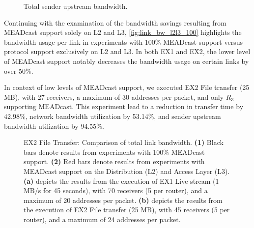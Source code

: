 \begin{figure}
    \begin{center}
        
    \end{center}
    \caption[Total sender upstream bandwidth]{Total sender upstream bandwidth.}
    \label{fig:upstreamcmp}
\end{figure}

Continuing with the examination of the bandwidth savings resulting from
    MEADcast support solely on L2 and L3, \autoref{fig:link_bw_l2l3_100}
    highlights the bandwidth usage per link in experiments with 100\% MEADcast
    support versus protocol support exclusively on L2 and L3.
In both EX1 and EX2, the lower level of MEADcast support notably decreases
    the bandwidth usage on certain links by over 50\%.
    
In context of low levels of MEADcast support, we executed EX2 File transfer
    (25 MB), with 27 receivers, a maximum of 30 addresses per packet, and only
    $R_3$ supporting MEADcast.
This experiment lead to a reduction in transfer time by 42.98\%, network
    bandwidth utilization by 53.14\%, and sender upstream bandwidth utilization
    by 94.55\%.

\begin{figure}
    \begin{center}
        
    \end{center}
    \caption[EX2 File Transfer: Comparison of total link bandwidth]{
        EX2 File Transfer: Comparison of total link bandwidth.
        \textbf{(1)} Black bars denote results from experiments with 100\%
            MEADcast support.
        \textbf{(2)} Red bars denote results from experiments with MEADcast
            support on the Distribution (L2) and Access Layer (L3).
        \textbf{(a)} depicts the results from the execution of EX1 Live
            stream (1 MB/s for 45 seconds), with 70 receivers (5 per router),
            and a maximum of 20 addresses per packet.
        \textbf{(b)} depicts the results from the execution of EX2 File
            transfer (25 MB), with 45 receivers (5 per router), and a maximum
            of 24 addresses per packet.
    }
    \label{fig:link_bw_l2l3_100}
\end{figure}


